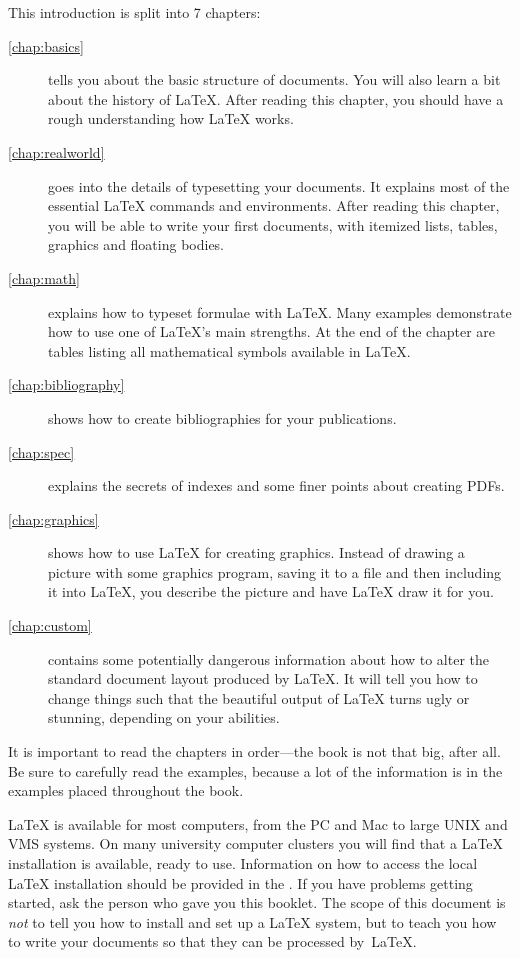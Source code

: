 \bigskip
\noindent This introduction is split into 7 chapters:
\begin{description}
  \item[\autoref{chap:basics}] tells you about the basic structure of
    \LaTeXe{} documents. You will also learn a bit about the history of
    \LaTeX{}. After reading this chapter, you should have a rough understanding
    how \LaTeX{} works.
  \item[\autoref{chap:realworld}] goes into the details of typesetting your
    documents. It explains most of the essential \LaTeX{} commands and
    environments. After reading this chapter, you will be able to write your
    first documents, with itemized lists, tables, graphics and floating bodies.
  \item[\autoref{chap:math}] explains how to typeset formulae with \LaTeX.
    Many examples demonstrate how to use one of \LaTeX{}'s main strengths. At
    the end of the chapter are tables listing all mathematical symbols
    available in \LaTeX{}.
  \item[\autoref{chap:bibliography}] shows how to create bibliographies for
    your publications.
  \item[\autoref{chap:spec}] explains the secrets of indexes and some finer
    points about creating PDFs.
  \item[\autoref{chap:graphics}] shows how to use \LaTeX{} for creating
    graphics. Instead of drawing a picture with some graphics program, saving
    it to a file and then including it into \LaTeX{}, you describe the picture
    and have \LaTeX{} draw it for you.
  \item[\autoref{chap:custom}] contains some potentially dangerous
    information about how to alter the standard document layout produced by
    \LaTeX{}. It will tell you how  to change things such that the beautiful
    output of \LaTeX{} turns ugly or stunning, depending on your abilities.
\end{description}
\bigskip
\noindent It is important to read the chapters in order---the book is
not that big, after all. Be sure to carefully read the examples,
because a lot of the information is in the
examples placed throughout the book.

\bigskip
\noindent \LaTeX{} is available for most computers, from the PC and Mac to large
UNIX and VMS systems. On many university computer clusters you will
find that a \LaTeX{} installation is available, ready to use.
Information on how to access
the local \LaTeX{} installation should be provided in the \guide. If
you have problems getting started, ask the person who gave you this
booklet. The scope of this document is \emph{not} to tell you how to
install and set up a \LaTeX{} system, but to teach you how to write
your documents so that they can be processed by~\LaTeX{}.

